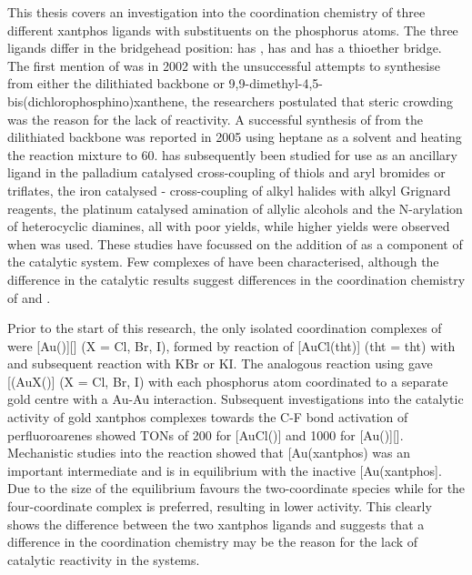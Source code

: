 This thesis covers an investigation into the coordination chemistry of three different xantphos ligands with \tBu{} substituents on the phosphorus atoms.  The three ligands differ in the bridgehead position: \tBuxantphos{} has , \tBusixantphos{} has  and \tButhixantphos{} has a thioether bridge.  The first mention of \tBuxantphos{} was in 2002 with the unsuccessful attempts to synthesise \tBuxantphos{} from either the dilithiated backbone or 9,9-dimethyl-4,5-bis(dichlorophosphino)xanthene, the researchers postulated that steric crowding was the reason for the lack of reactivity.\cite{Zuideveld2002}  A successful synthesis of \tBuxantphos{} from the dilithiated backbone was reported in 2005 using heptane as a solvent and heating the reaction mixture to 60\degC{}.\cite{Mispelaere2005}  \tBuXantphos{} has subsequently been studied for use as an ancillary ligand in the palladium catalysed cross-coupling of thiols and aryl bromides or triflates, the iron catalysed - cross-coupling of alkyl halides with alkyl Grignard reagents, the platinum catalysed amination of allylic alcohols and the N-arylation of heterocyclic diamines, all with poor yields, while higher yields were observed when \Phxantphos{} was used.\cite{Mispelaere2005, Dongol2007, Ohshima2009, Cabello2007}  These studies have focussed on the addition of \tBuxantphos{} as a component of the catalytic system.  Few complexes of \tBuxantphos{} have been characterised, although the difference in the catalytic results suggest differences in the coordination chemistry of \Phxantphos{} and \tBuxantphos{}.  


Prior to the start of this research, the only isolated coordination complexes of \tBuxantphos{} were [Au(\tBuxantphos)][] (X = Cl, Br, I), formed by reaction of [AuCl(\acrshort{tht})] (\acrshort{tht} = \acrlong{tht}) with \tBuxantphos{} and subsequent reaction with KBr or KI.\cite{Partyka2010}  The analogous reaction using \Phxantphos{} gave [(AuX(\Phxantphos)] (X = Cl, Br, I) with each phosphorus atom coordinated to a separate gold centre with a Au-Au interaction.\cite{Pintado2004, Partyka2010}  Subsequent investigations into the catalytic activity of gold xantphos complexes towards the C-F bond activation of perfluoroarenes showed \glspl{TON} of 200 for [AuCl(\Phxantphos)] and 1000 for [Au(\tBuxantphos)][].\cite{Zhan2012}  Mechanistic studies into the reaction showed that [Au(xantphos)\ce{]+} was an important intermediate and is in equilibrium with the inactive [Au(xantphos].  Due to the size of \tBuxantphos{} the equilibrium favours the two-coordinate species while for \Phxantphos{} the four-coordinate complex is preferred, resulting in lower activity.\cite{Zhan2012}  This clearly shows the difference between the two xantphos ligands and suggests that a difference in the coordination chemistry may be the reason for the lack of catalytic reactivity in the \tBuxantphos{} systems.  

